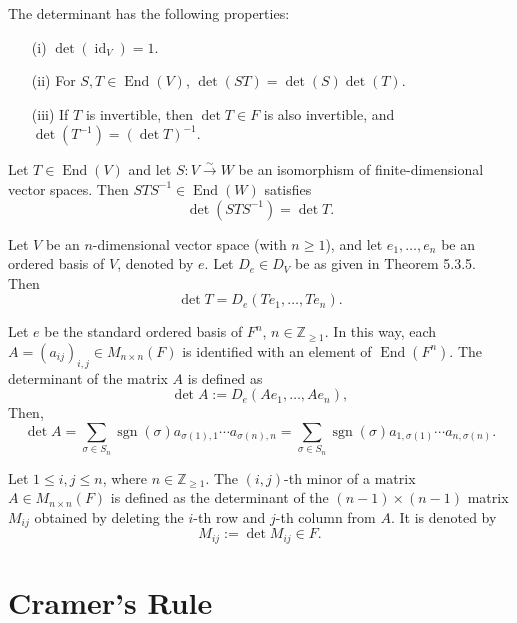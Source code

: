 \begin{theorem}
The determinant has the following properties:
\begin{itemize}
    \item[(i)] $\det(\operatorname{id}_V) = 1$.
    \item[(ii)] For $S, T \in \operatorname{End}(V)$, $\det(ST) = \det(S)\det(T)$.
    \item[(iii)] If $T$ is invertible, then $\det T \in F$ is also invertible, and $\det(T^{-1}) = (\det T)^{-1}$.
\end{itemize}
\end{theorem}

\begin{proposition}
Let $T \in \operatorname{End}(V)$ and let $S : V \xrightarrow{\sim} W$ be an isomorphism of finite-dimensional vector spaces. Then $STS^{-1} \in \operatorname{End}(W)$ satisfies
\[
\det(STS^{-1}) = \det T.
\]
\end{proposition}

\begin{proposition}
Let $V$ be an $n$-dimensional vector space (with $n \geq 1$), and let $e_1, \ldots, e_n$ be an ordered basis of $V$, denoted by $e$. Let $D_e \in D_V$ be as given in Theorem 5.3.5. Then
\[
\det T = D_e(T e_1, \ldots, T e_n).
\]
\end{proposition}

\begin{proposition}
Let $e$ be the standard ordered basis of $F^n$, $n \in \mathbb{Z}_{\geq 1}$. In this way, each $A = (a_{ij})_{i,j} \in M_{n \times n}(F)$ is identified with an element of $\operatorname{End}(F^n)$. The determinant of the matrix $A$ is defined as
\[
\det A := D_e(Ae_1, \ldots, Ae_n),
\]
Then,
\[
\det A = \sum_{\sigma \in S_n} \operatorname{sgn}(\sigma) a_{\sigma(1),1} \cdots a_{\sigma(n),n}
= \sum_{\sigma \in S_n} \operatorname{sgn}(\sigma) a_{1,\sigma(1)} \cdots a_{n,\sigma(n)}.
\]
\end{proposition}

\begin{definition}
Let $1 \leq i, j \leq n$, where $n \in \mathbb{Z}_{\geq 1}$. The $(i, j)$-th minor of a matrix $A \in M_{n \times n}(F)$ is defined as the determinant of the $(n-1) \times (n-1)$ matrix $M_{ij}$ obtained by deleting the $i$-th row and $j$-th column from $A$. It is denoted by
\[
M_{ij} := \det M_{ij} \in F.
\]
\end{definition}

\section{Cramer's Rule}

